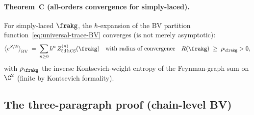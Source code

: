 \paragraph{Theorem~C (all-orders convergence for simply-laced).}
For simply-laced $\frakg$, the $\hbar$-expansion of the BV partition
function~\eqref{eq:universal-trace-BV} converges (is not merely asymptotic):
\begin{equation}
\label{eq:all-orders-convergence}
  \bigl\langle e^{S/\hbar}\bigr\rangle_{\mathrm{BV}}
  \;=\; \sum_{n\ge 0}\hbar^n\,
  Z^{(n)}_{5\mathrm{d\,hCS}}(\frakg)
  \quad\text{with radius of convergence}\quad R(\frakg) \;\ge\; \rho_\frakg > 0,
\end{equation}
with $\rho_\frakg$ the inverse Kontsevich-weight entropy of the
Feynman-graph sum on $\C^2$ (finite by Kontsevich formality).

\subsection*{The three-paragraph proof (chain-level BV)}

